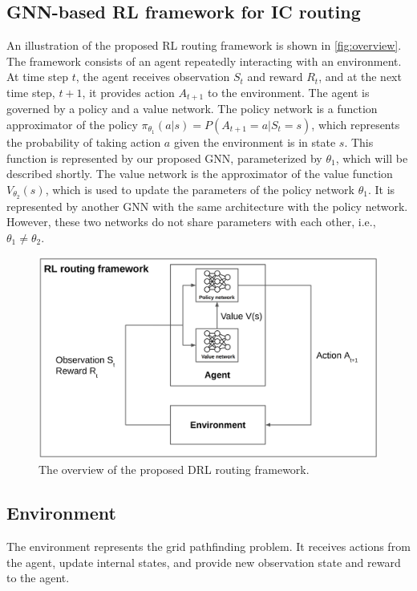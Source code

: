 \documentclass[letterpaper]{article}
\begin{document}
\subsection{GNN-based RL framework for IC routing}
An illustration of the proposed RL routing framework is shown in \autoref{fig:overview}. The framework consists of an agent repeatedly interacting with an environment. At time step $t$, the agent receives observation $S_{t}$ and reward $R_{t}$, and at the next time step, $t+1$, it provides action $A_{t+1}$ to the environment. The agent is governed by a policy and a value network. The policy network is a function approximator of the policy $\pi_{\theta_1}(a|s)=P(A_{t+1}=a|S_{t}=s)$, which represents the probability of taking action $a$ given the environment is in state $s$. This function is represented by our proposed GNN, parameterized by $\theta_1$, which will be described shortly. The value network is the approximator of the value function $V_{\theta_2}(s)$, which is used to update the parameters of the policy network $\theta_1$. It is represented by another GNN with the same architecture with the policy network. However, these two networks do not share parameters with each other, i.e., $\theta_1\neq\theta_2$. 
\begin{figure}[h!]
    \centering
    \includegraphics[width=\textwidth]{figure/overview.png}
    \caption{The overview of the proposed DRL routing framework.}
    \label{fig:overview}
\end{figure}

\subsection{Environment}
The environment represents the grid pathfinding problem. It receives actions from the agent, update internal states, and provide new observation state and reward to the agent.
\end{document}
